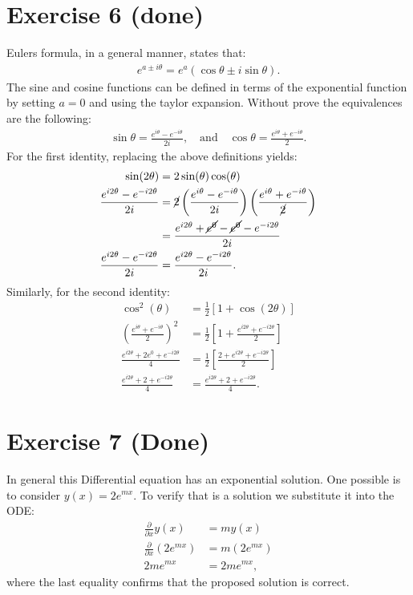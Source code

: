 \documentclass[letterpaper,11pt,twoside]{article}
\begin{document}
\section{Exercise 6 (done)}
Eulers formula, in a general manner, states that:
\begin{align}
  e^{a\pm i\theta}=e^{a}(\cos\theta\pm i\sin\theta).
\end{align}
The sine and cosine functions can be defined in terms of the exponential function by setting $a=0$ and using the taylor expansion.
Without prove the equivalences are the following:
\begin{align*}
  \sin\theta=\frac{e^{i\theta}-e^{-i\theta}}{2i},\quad\text{and}\quad\cos\theta=\frac{e^{i\theta}+e^{-i\theta}}{2}.
\end{align*}
For the first identity, replacing the above definitions yields:
\begin{align*}
  \sin(2\theta)&=2\sin(\theta)\cos(\theta)\\
  \frac{e^{i2\theta}-e^{-i2\theta}}{2i}&=\cancel{2}\left(\frac{e^{i\theta}-e^{-i\theta}}{2i}\right)\left(\frac{e^{i\theta}+e^{-i\theta}}{\cancel{2}}\right)\\
  &=\frac{e^{i2\theta}+\cancel{e^0}-\cancel{e^{0}}-e^{-i2\theta}}{2i}\\
  \frac{e^{i2\theta}-e^{-i2\theta}}{2i}&=\frac{e^{i2\theta}-e^{-i2\theta}}{2i}.
\end{align*}
Similarly, for the second identity:
\begin{align*}
  \cos^2(\theta)&=\frac{1}{2}[1+\cos(2\theta)]\\
  \left(\frac{e^{i\theta}+e^{-i\theta}}{2}\right)^2&=\frac{1}{2}\left[1+\frac{e^{i2\theta}+e^{-i2\theta}}{2}\right]\\
  \frac{e^{i2\theta}+2e^{0}+e^{-i2\theta}}{4}&=\frac{1}{2}\left[\frac{2+e^{i2\theta}+e^{-i2\theta}}{2}\right]\\
  \frac{e^{i2\theta}+2+e^{-i2\theta}}{4}&=\frac{e^{i2\theta}+2+e^{-i2\theta}}{4}.
\end{align*}
\section{Exercise 7 (Done)}
In general this Differential equation has an exponential solution. One possible is to consider $y(x)=2e^{mx}$. To verify that is a solution we 
substitute it into the ODE:
\begin{align*}
  \frac{\partial}{\partial x}y(x)&=my(x)\\
  \frac{\partial}{\partial x}(2e^{mx})&=m(2e^{mx})\\
  2me^{mx}&=2me^{mx},
\end{align*}
where the last equality confirms that the proposed solution is correct.
\end{document}
